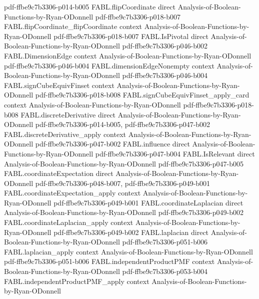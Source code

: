 \begin{theorem}
  {pdf-ffbe9c7b3306-p014-b005}
\proofstep
  {FABL.flipCoordinate}
  {direct}
  {Analysis-of-Boolean-Functions-by-Ryan-ODonnell}
  {pdf-ffbe9c7b3306-p018-b007}
\proofstep
  {FABL.flipCoordinate_flipCoordinate}
  {context}
  {Analysis-of-Boolean-Functions-by-Ryan-ODonnell}
  {pdf-ffbe9c7b3306-p018-b007}
\proofstep
  {FABL.IsPivotal}
  {direct}
  {Analysis-of-Boolean-Functions-by-Ryan-ODonnell}
  {pdf-ffbe9c7b3306-p046-b002}
\proofstep
  {FABL.DimensionEdge}
  {context}
  {Analysis-of-Boolean-Functions-by-Ryan-ODonnell}
  {pdf-ffbe9c7b3306-p046-b004}
\proofstep
  {FABL.dimensionEdgeNonempty}
  {context}
  {Analysis-of-Boolean-Functions-by-Ryan-ODonnell}
  {pdf-ffbe9c7b3306-p046-b004}
\proofstep
  {FABL.signCubeEquivFinset}
  {context}
  {Analysis-of-Boolean-Functions-by-Ryan-ODonnell}
  {pdf-ffbe9c7b3306-p018-b008}
\proofstep
  {FABL.signCubeEquivFinset_apply_card}
  {context}
  {Analysis-of-Boolean-Functions-by-Ryan-ODonnell}
  {pdf-ffbe9c7b3306-p018-b008}
\proofstep
  {FABL.discreteDerivative}
  {direct}
  {Analysis-of-Boolean-Functions-by-Ryan-ODonnell}
  {pdf-ffbe9c7b3306-p014-b005,
    pdf-ffbe9c7b3306-p047-b002}
\proofstep
  {FABL.discreteDerivative_apply}
  {context}
  {Analysis-of-Boolean-Functions-by-Ryan-ODonnell}
  {pdf-ffbe9c7b3306-p047-b002}
\proofstep
  {FABL.influence}
  {direct}
  {Analysis-of-Boolean-Functions-by-Ryan-ODonnell}
  {pdf-ffbe9c7b3306-p047-b004}
\proofstep
  {FABL.IsRelevant}
  {direct}
  {Analysis-of-Boolean-Functions-by-Ryan-ODonnell}
  {pdf-ffbe9c7b3306-p047-b005}
\proofstep
  {FABL.coordinateExpectation}
  {direct}
  {Analysis-of-Boolean-Functions-by-Ryan-ODonnell}
  {pdf-ffbe9c7b3306-p048-b007,
    pdf-ffbe9c7b3306-p049-b001}
\proofstep
  {FABL.coordinateExpectation_apply}
  {context}
  {Analysis-of-Boolean-Functions-by-Ryan-ODonnell}
  {pdf-ffbe9c7b3306-p049-b001}
\proofstep
  {FABL.coordinateLaplacian}
  {direct}
  {Analysis-of-Boolean-Functions-by-Ryan-ODonnell}
  {pdf-ffbe9c7b3306-p049-b002}
\proofstep
  {FABL.coordinateLaplacian_apply}
  {context}
  {Analysis-of-Boolean-Functions-by-Ryan-ODonnell}
  {pdf-ffbe9c7b3306-p049-b002}
\proofstep
  {FABL.laplacian}
  {direct}
  {Analysis-of-Boolean-Functions-by-Ryan-ODonnell}
  {pdf-ffbe9c7b3306-p051-b006}
\proofstep
  {FABL.laplacian_apply}
  {context}
  {Analysis-of-Boolean-Functions-by-Ryan-ODonnell}
  {pdf-ffbe9c7b3306-p051-b006}
\proofstep
  {FABL.independentProductPMF}
  {context}
  {Analysis-of-Boolean-Functions-by-Ryan-ODonnell}
  {pdf-ffbe9c7b3306-p053-b004}
\proofstep
  {FABL.independentProductPMF_apply}
  {context}
  {Analysis-of-Boolean-Functions-by-Ryan-ODonnell}

\end{theorem}
